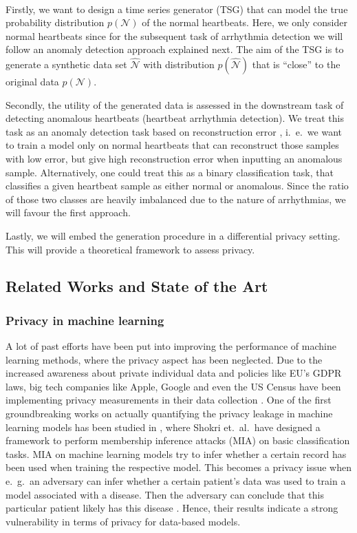\paragraph{}

Firstly, we want to design a time series generator (TSG) that can model the true probability distribution $p(\mathcal{N})$ of the normal heartbeats. Here, we only consider normal heartbeats since for the subsequent task of arrhythmia detection we will follow an anomaly detection approach explained next. The aim of the TSG is to generate a synthetic data set $\widehat{\mathcal{N}}$ with distribution $p(\widehat{\mathcal{N}})$ that is ``close'' to the original data $p(\mathcal{N})$.

Secondly, the utility of the generated data is assessed in the downstream task of detecting anomalous heartbeats (heartbeat arrhythmia detection). We treat this task as an anomaly detection task based on reconstruction error \parencite[Section 3.2]{anom_rev}, i.\ e.\ we want to train a model only on normal heartbeats that can reconstruct those samples with low error, but give high reconstruction error when inputting an anomalous sample. Alternatively, one could treat this as a binary classification task, that classifies a given heartbeat sample as either normal or anomalous. Since the ratio of those two classes are heavily imbalanced due to the nature of arrhythmias, we will favour the first approach.

Lastly, we will embed the generation procedure in a differential privacy setting. This will provide a theoretical framework to assess privacy.

\subsection{Related Works and State of the Art}

\subsubsection*{Privacy in machine learning}
A lot of past efforts have been put into improving the performance of machine learning methods, where the privacy aspect has been neglected. Due to the increased awareness about private individual data and policies like EU's GDPR laws, big tech companies like Apple, Google and even the US Census have been implementing privacy measurements in their data collection \parencite[see][]{dwork2019differential,abowd2019census}. One of the first groundbreaking works on actually quantifying the privacy leakage in machine learning models has been studied in \parencite{shokri2017membership}, where Shokri et.\ al.\ have designed a framework to perform membership inference attacks (MIA) on basic classification tasks. MIA on machine learning models try to infer whether a certain record has been used when training the respective model. This becomes a privacy issue when e.\ g.\ an adversary can infer whether a certain patient's data was used to train a model associated with a disease. Then the adversary can conclude that this particular patient likely has this disease \parencite[cf.][p. 5]{shokri2017membership}. Hence, their results indicate a strong vulnerability in terms of privacy for data-based models.


